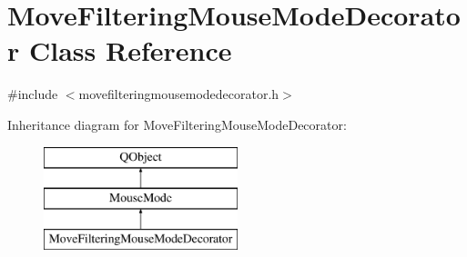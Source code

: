 \hypertarget{class_move_filtering_mouse_mode_decorator}{}\section{Move\+Filtering\+Mouse\+Mode\+Decorator Class Reference}
\label{class_move_filtering_mouse_mode_decorator}


{\ttfamily \#include $<$movefilteringmousemodedecorator.\+h$>$}

Inheritance diagram for Move\+Filtering\+Mouse\+Mode\+Decorator\+:\begin{figure}[H]
\begin{center}
\leavevmode
\includegraphics[height=3.000000cm]{d7/d22/class_move_filtering_mouse_mode_decorator}
\end{center}
\end{figure}
